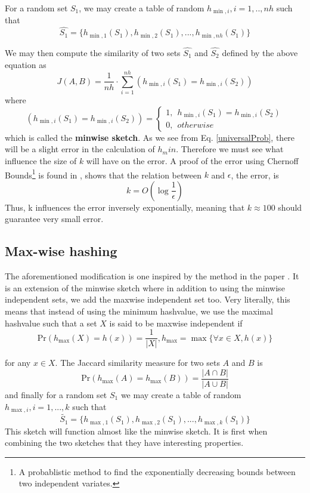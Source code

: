 \documentclass[../../main.tex]{subfiles}
\begin{document}
For a random set $S_1$, we may create a table of random $h_{\min,i},i=1,..,nh$ such that
$$
\hat{S_1} = \{ h_{\min,1}(S_1),h_{\min,2}(S_1),...,h_{\min,nh}(S_1)\}
$$

We may then compute the similarity of two sets $\hat{S_1}$ and $\hat{S_2}$ defined by the above equation as
\begin{equation}\label{jacsketch}
J(A,B)=\frac{1}{nh}\cdot \sum_{i=1}^{nh} (h_{\min,i}(S_1) = h_{\min,i}(S_2))
\end{equation}
where
$$
(h_{\min,i}(S_1) = h_{\min,i}(S_2)) = \left\{ \begin{array}{ll}
												1, \ \ h_{\min,i}(S_1)=h_{\min,i}(S_2)\\
												0, \ \ otherwise
											  \end{array}\right.
$$
which is called the \textbf{minwise sketch}. As we see from Eq. \ref{universalProb}, there will be a slight error in the calculation of $h_min$. Therefore we must see what influence the size of $k$ will have on the error. A proof of the error using Chernoff Bounds\footnote{A probablistic method to find the exponentially decreasing bounds between two independent variates.} is found in \cite{errorMinhash}, shows that the relation between $k$ and $\epsilon$, the error, is 
$$
k=O\left(\log \frac{1}{\epsilon}\right)
$$
Thus, k influences the error inversely exponentially, meaning that $k\approx 100$ should guarantee very small error.

\subsection{Max-wise hashing}

The aforementioned modification is one inspired by the method in the paper \cite{minmaxhash}. It is an extension of the minwise sketch where in addition to using the minwise independent sets, we add the maxwise independent set too. Very literally, this means that instead of using the minimum hashvalue, we use the maximal hashvalue such that a set $X$ is said to be maxwise independent if
\begin{equation}\label{maxwise}
\mathrm{Pr}(h_{\max}(X)=h(x))=\frac{1}{|X|}, h_{\max}=\max\{\forall x \in X, h(x)\} 
\end{equation}

for any $x\in X$. The Jaccard similarity measure for two sets $A$ and $B$ is
\begin{equation}\label{maxwisejaccard}
\mathrm{Pr}(h_{\max}(A)=h_{\max}(B))=\frac{|A\cap B|}{|A\cup B|}
\end{equation}
and finally for a random set $S_1$ we may create a table of random $h_{\max,i},i=1,...,k$ such that
$$
\tilde{S_1} = \{ h_{\max,1}(S_1),h_{\max,2}(S_1),...,h_{\max,k}(S_1)\}
$$
This sketch will function almost like the minwise sketch. It is first when combining the two sketches that they have interesting properties.
\end{document}
